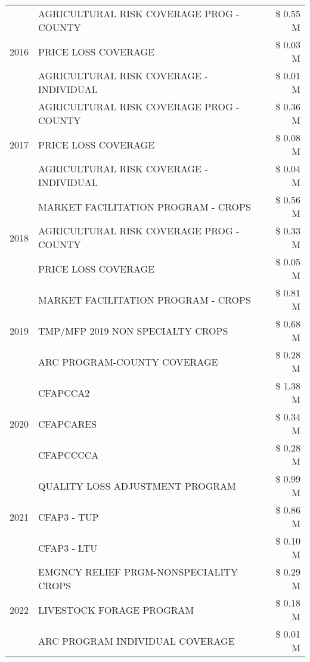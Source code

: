 \begin{tabular}{llr}
\multirow[t]{3}{*}{2016} & AGRICULTURAL RISK COVERAGE PROG - COUNTY & \$ 0.55 M \\
 & PRICE LOSS COVERAGE & \$ 0.03 M \\
 & AGRICULTURAL RISK COVERAGE - INDIVIDUAL & \$ 0.01 M \\
\cline{1-3}
\multirow[t]{3}{*}{2017} & AGRICULTURAL RISK COVERAGE PROG - COUNTY & \$ 0.36 M \\
 & PRICE LOSS COVERAGE & \$ 0.08 M \\
 & AGRICULTURAL RISK COVERAGE - INDIVIDUAL & \$ 0.04 M \\
\cline{1-3}
\multirow[t]{3}{*}{2018} & MARKET FACILITATION PROGRAM - CROPS & \$ 0.56 M \\
 & AGRICULTURAL RISK COVERAGE PROG - COUNTY & \$ 0.33 M \\
 & PRICE LOSS COVERAGE & \$ 0.05 M \\
\cline{1-3}
\multirow[t]{3}{*}{2019} & MARKET FACILITATION PROGRAM - CROPS & \$ 0.81 M \\
 & TMP/MFP 2019 NON SPECIALTY CROPS & \$ 0.68 M \\
 & ARC PROGRAM-COUNTY COVERAGE & \$ 0.28 M \\
\cline{1-3}
\multirow[t]{3}{*}{2020} & CFAPCCA2 & \$ 1.38 M \\
 & CFAPCARES & \$ 0.34 M \\
 & CFAPCCCCA & \$ 0.28 M \\
\cline{1-3}
\multirow[t]{3}{*}{2021} & QUALITY LOSS ADJUSTMENT PROGRAM & \$ 0.99 M \\
 & CFAP3 - TUP & \$ 0.86 M \\
 & CFAP3 - LTU & \$ 0.10 M \\
\cline{1-3}
\multirow[t]{3}{*}{2022} & EMGNCY RELIEF PRGM-NONSPECIALITY CROPS & \$ 0.29 M \\
 & LIVESTOCK FORAGE PROGRAM & \$ 0.18 M \\
 & ARC PROGRAM INDIVIDUAL COVERAGE & \$ 0.01 M \\
\cline{1-3}
\bottomrule
\end{tabular}
